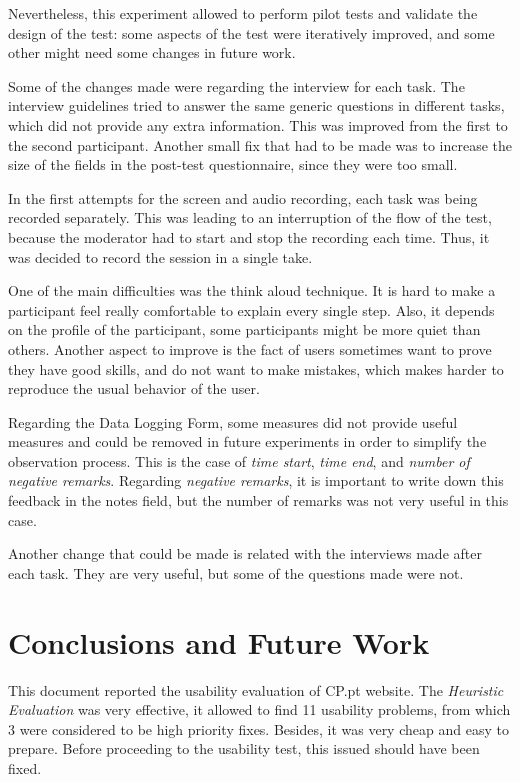 \documentclass[a4paper]{article}
\begin{document}
Nevertheless, this experiment allowed to perform pilot tests and validate the design of the test: some aspects of the test were iteratively improved, and some other might need some changes in future work.

Some of the changes made were regarding the interview for each task.
The interview guidelines tried to answer the same generic questions in different tasks, which did not provide any extra information.
This was improved from the first to the second participant.
Another small fix that had to be made was to increase the size of the fields in the post-test questionnaire, since they were too small.

In the first attempts for the screen and audio recording, each task was being recorded separately. This was leading to an interruption of the flow of the test, because the moderator had to start and stop the recording each time. Thus, it was decided to record the session in a single take.

One of the main difficulties was the think aloud technique. It is hard to make a participant feel really comfortable to explain every single step. Also, it depends on the profile of the participant, some participants might be more quiet than others. Another aspect to improve is the fact of users sometimes want to prove they have good skills, and do not want to make mistakes, which makes harder to reproduce the usual behavior of the user.

Regarding the Data Logging Form, some measures did not provide useful measures and could be removed in future experiments in order to simplify the observation process. This is the case of \emph{time start}, \emph{time end}, and \emph{number of negative remarks}. Regarding \emph{negative remarks}, it is important to write down this feedback in the notes field, but the number of remarks was not very useful in this case.

Another change that could be made is related with the interviews made after each task. They are very useful, but some of the questions made were not.




\section{Conclusions and Future Work}

This document reported the usability evaluation of CP.pt website. The \emph{Heuristic Evaluation} was very effective, it allowed to find 11 usability problems, from which 3 were considered to be high priority fixes. Besides, it was very cheap and easy to prepare. Before proceeding to the usability test, this issued should have been fixed.
\end{document}

